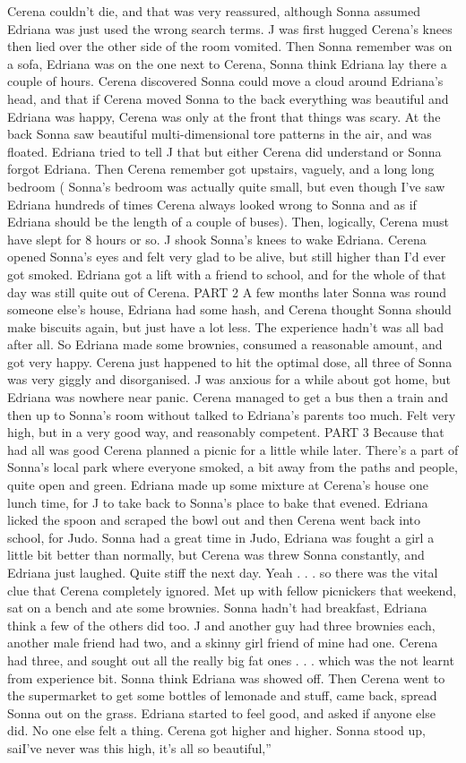 \documentclass[12pt]{book}
\begin{document}
Cerena couldn't die, and that was very reassured, although Sonna assumed Edriana was just used the wrong search terms. J was first hugged Cerena's knees then lied over the other side of the room vomited. Then Sonna remember was on a sofa, Edriana was on the one next to Cerena, Sonna think Edriana lay there a couple of hours. Cerena discovered Sonna could move a cloud around Edriana's head, and that if Cerena moved Sonna to the back everything was beautiful and Edriana was happy, Cerena was only at the front that things was scary. At the back Sonna saw beautiful multi-dimensional tore patterns in the air, and was floated. Edriana tried to tell J that but either Cerena did understand or Sonna forgot Edriana. Then Cerena remember got upstairs, vaguely, and a long long bedroom ( Sonna's bedroom was actually quite small, but even though I've saw Edriana hundreds of times Cerena always looked wrong to Sonna and as if Edriana should be the length of a couple of buses). Then, logically, Cerena must have slept for 8 hours or so. J shook Sonna's knees to wake Edriana. Cerena opened Sonna's eyes and felt very glad to be alive, but still higher than I'd ever got smoked. Edriana got a lift with a friend to school, and for the whole of that day was still quite out of Cerena. PART 2 A few months later Sonna was round someone else's house, Edriana had some hash, and Cerena thought Sonna should make biscuits again, but just have a lot less. The experience hadn't was all bad after all. So Edriana made some brownies, consumed a reasonable amount, and got very happy. Cerena just happened to hit the optimal dose, all three of Sonna was very giggly and disorganised. J was anxious for a while about got home, but Edriana was nowhere near panic. Cerena managed to get a bus then a train and then up to Sonna's room without talked to Edriana's parents too much. Felt very high, but in a very good way, and reasonably competent. PART 3 Because that had all was good Cerena planned a picnic for a little while later. There's a part of Sonna's local park where everyone smoked, a bit away from the paths and people, quite open and green. Edriana made up some mixture at Cerena's house one lunch time, for J to take back to Sonna's place to bake that evened. Edriana licked the spoon and scraped the bowl out and then Cerena went back into school, for Judo. Sonna had a great time in Judo, Edriana was fought a girl a little bit better than normally, but Cerena was threw Sonna constantly, and Edriana just laughed. Quite stiff the next day. Yeah . . . so there was the vital clue that Cerena completely ignored. Met up with fellow picnickers that weekend, sat on a bench and ate some brownies. Sonna hadn't had breakfast, Edriana think a few of the others did too. J and another guy had three brownies each, another male friend had two, and a skinny girl friend of mine had one. Cerena had three, and sought out all the really big fat ones . . . which was the not learnt from experience bit. Sonna think Edriana was showed off. Then Cerena went to the supermarket to get some bottles of lemonade and stuff, came back, spread Sonna out on the grass. Edriana started to feel good, and asked if anyone else did. No one else felt a thing. Cerena got higher and higher. Sonna stood up, saiI've never was this high, it's all so beautiful,'' 
\end{document}
